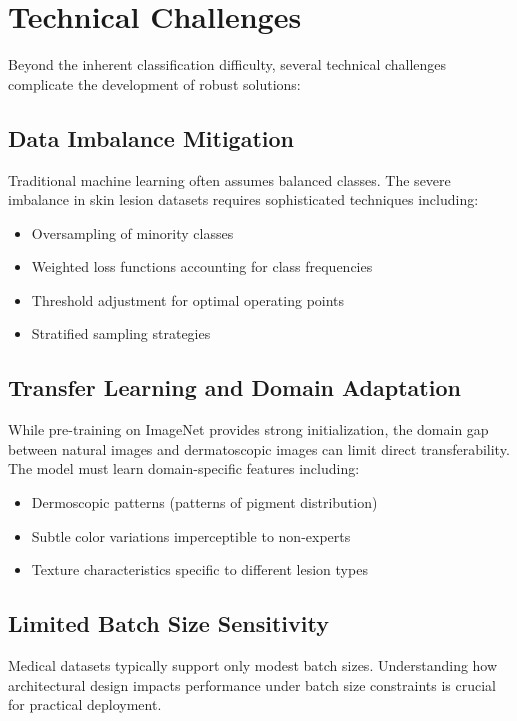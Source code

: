 \section{Technical Challenges}

Beyond the inherent classification difficulty, several technical challenges complicate the development of robust solutions:

\subsection{Data Imbalance Mitigation}

Traditional machine learning often assumes balanced classes. The severe imbalance in skin lesion datasets requires sophisticated techniques including:

\begin{itemize}
    \item Oversampling of minority classes
    \item Weighted loss functions accounting for class frequencies
    \item Threshold adjustment for optimal operating points
    \item Stratified sampling strategies
\end{itemize}

\subsection{Transfer Learning and Domain Adaptation}

While pre-training on ImageNet provides strong initialization, the domain gap between natural images and dermatoscopic images can limit direct transferability. The model must learn domain-specific features including:

\begin{itemize}
    \item Dermoscopic patterns (patterns of pigment distribution)
    \item Subtle color variations imperceptible to non-experts
    \item Texture characteristics specific to different lesion types
\end{itemize}

\subsection{Limited Batch Size Sensitivity}

Medical datasets typically support only modest batch sizes. Understanding how architectural design impacts performance under batch size constraints is crucial for practical deployment.

